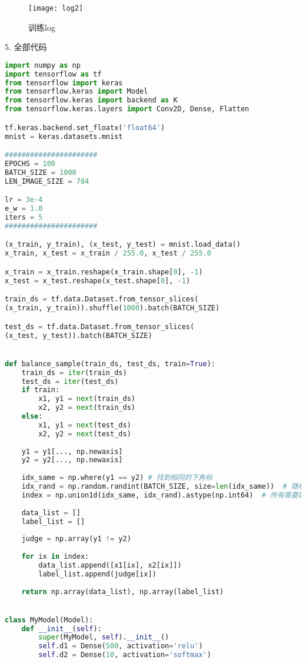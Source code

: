 \documentclass{article}
\begin{document}
	\begin{figure}[H]
		\centering
		\texttt{[image: log2]}
		\caption{训练log}
		\label{fig:log2}
	\end{figure}

	
	5. 全部代码
	
	
\begin{lstlisting}[language=Python]
import numpy as np
import tensorflow as tf
from tensorflow import keras
from tensorflow.keras import Model
from tensorflow.keras import backend as K
from tensorflow.keras.layers import Conv2D, Dense, Flatten

tf.keras.backend.set_floatx('float64')
mnist = keras.datasets.mnist

######################
EPOCHS = 100
BATCH_SIZE = 1000
LEN_IMAGE_SIZE = 784

lr = 3e-4
e_w = 1.0
iters = 5
######################

(x_train, y_train), (x_test, y_test) = mnist.load_data()
x_train, x_test = x_train / 255.0, x_test / 255.0

x_train = x_train.reshape(x_train.shape[0], -1)
x_test = x_test.reshape(x_test.shape[0], -1)

train_ds = tf.data.Dataset.from_tensor_slices(
(x_train, y_train)).shuffle(1000).batch(BATCH_SIZE)

test_ds = tf.data.Dataset.from_tensor_slices(
(x_test, y_test)).batch(BATCH_SIZE)


def balance_sample(train_ds, test_ds, train=True):
	train_ds = iter(train_ds)
	test_ds = iter(test_ds)
	if train:
		x1, y1 = next(train_ds)
		x2, y2 = next(train_ds)
	else:
		x1, y1 = next(test_ds)
		x2, y2 = next(test_ds)
	
	y1 = y1[..., np.newaxis]
	y2 = y2[..., np.newaxis]
	
	idx_same = np.where(y1 == y2) # 找到相同的下角标
	idx_rand = np.random.randint(BATCH_SIZE, size=len(idx_same))  # 随机取样
	index = np.union1d(idx_same, idx_rand).astype(np.int64)  # 所有需要取样的样本
	
	data_list = []
	label_list = []
	
	judge = np.array(y1 != y2)
	
	for ix in index:
		data_list.append([x1[ix], x2[ix]])
		label_list.append(judge[ix])
	
	return np.array(data_list), np.array(label_list)


class MyModel(Model):
	def __init__(self):
		super(MyModel, self).__init__()
		self.d1 = Dense(500, activation='relu')
		self.d2 = Dense(10, activation='softmax')
		

\end{lstlisting}
\end{document}
